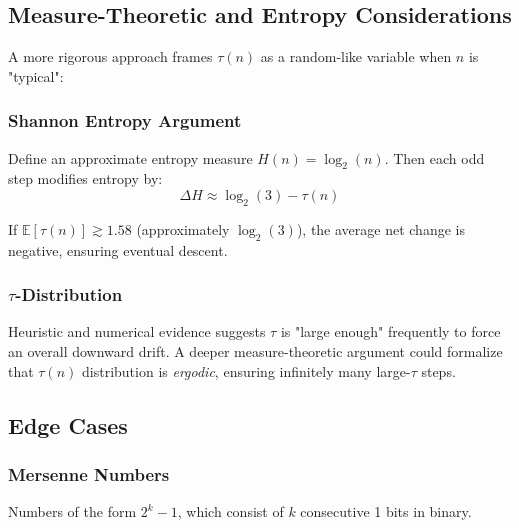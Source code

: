 \subsection{Measure-Theoretic and Entropy Considerations}

A more rigorous approach frames $\tau(n)$ as a random-like variable when $n$ is "typical":

\subsubsection{Shannon Entropy Argument}

\begin{definition}
Define an approximate entropy measure $H(n) = \log_2(n)$. Then each odd step modifies entropy by:
\[
\Delta H \approx \log_2(3) - \tau(n)
\]
\end{definition}

\begin{proposition}
If $\mathbb{E}[\tau(n)] \gtrsim 1.58$ (approximately $\log_2(3)$), the average net change is negative, ensuring eventual descent.
\end{proposition}

\subsubsection{$\tau$-Distribution}

\begin{proposition}
Heuristic and numerical evidence suggests $\tau$ is "large enough" frequently to force an overall downward drift. A deeper measure-theoretic argument could formalize that $\tau(n)$ distribution is \emph{ergodic}, ensuring infinitely many large-$\tau$ steps.
\end{proposition}

\subsection{Edge Cases}\label{sec:edge_cases}

\subsubsection{Mersenne Numbers}

\begin{definition}
Numbers of the form $2^k - 1$, which consist of $k$ consecutive 1 bits in binary.
\end{definition}

